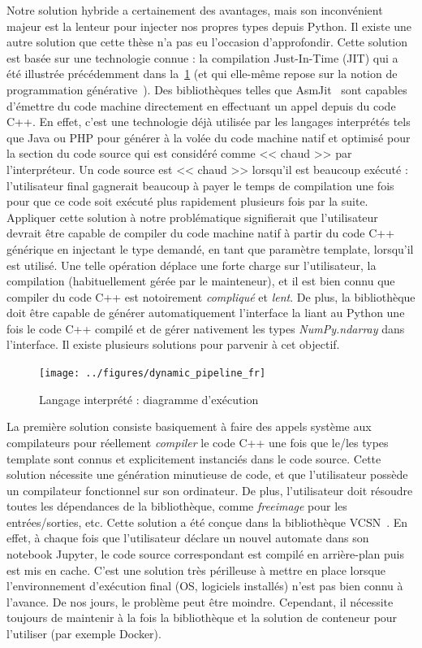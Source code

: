 Notre solution hybride a certainement des avantages, mais son inconvénient majeur est la lenteur pour injecter nos
propres types depuis Python. Il existe une autre solution que cette thèse n'a pas eu l'occasion d'approfondir. Cette
solution est basée sur une technologie connue : la compilation Just-In-Time (JIT) qui a été illustrée précédemment dans
la~\cref{resume:fig:static.dynamic.dynamic.pipeline} (et qui elle-même repose sur la notion de programmation
générative~\parencite{czarnecki.2000.generative}). Des bibliothèques telles que AsmJit~\parencite{kobalicek.2011.asmjit}
sont capables d'émettre du code machine directement en effectuant un appel depuis du code C++. En effet, c'est une
technologie déjà utilisée par les langages interprétés tels que Java ou PHP pour générer à la volée du code machine
natif et optimisé pour la section du code source qui est considéré comme << chaud >> par l'interpréteur. Un code source
est << chaud >> lorsqu'il est beaucoup exécuté : l'utilisateur final gagnerait beaucoup à payer le temps de compilation
une fois pour que ce code soit exécuté plus rapidement plusieurs fois par la suite. Appliquer cette solution à notre
problématique signifierait que l'utilisateur devrait être capable de compiler du code machine natif à partir du code C++
générique en injectant le type demandé, en tant que paramètre template, lorsqu'il est utilisé. Une telle opération
déplace une forte charge sur l'utilisateur, la compilation (habituellement gérée par le mainteneur), et il est bien
connu que compiler du code C++ est notoirement \emph{compliqué} et \emph{lent}. De plus, la bibliothèque doit être
capable de générer automatiquement l'interface la liant au Python une fois le code C++ compilé et de gérer nativement
les types \emph{NumPy.ndarray} dans l'interface. Il existe plusieurs solutions pour parvenir à cet objectif.

\begin{figure}[htbp]
  \centering
  \texttt{[image: ../figures/dynamic\_pipeline\_fr]}
  \caption{Langage interprété : diagramme d'exécution}
  \label{resume:fig:static.dynamic.dynamic.pipeline}
\end{figure}

La première solution consiste basiquement à faire des appels système aux compilateurs pour réellement \emph{compiler} le
code C++ une fois que le/les types template sont connus et explicitement instanciés dans le code source. Cette solution
nécessite une génération minutieuse de code, et que l'utilisateur possède un compilateur fonctionnel sur son ordinateur.
De plus, l'utilisateur doit résoudre toutes les dépendances de la bibliothèque, comme \emph{freeimage} pour les
entrées/sorties, etc. Cette solution a été conçue dans la bibliothèque VCSN~\parencite{demaille.2013.vcsn}. En effet, à
chaque fois que l'utilisateur déclare un nouvel automate dans son notebook Jupyter, le code source correspondant est
compilé en arrière-plan puis est mis en cache. C'est une solution très périlleuse à mettre en place lorsque
l'environnement d'exécution final (OS, logiciels installés) n'est pas bien connu à l'avance. De nos jours, le problème
peut être moindre. Cependant, il nécessite toujours de maintenir à la fois la bibliothèque et la solution de conteneur
pour l'utiliser (par exemple Docker).

